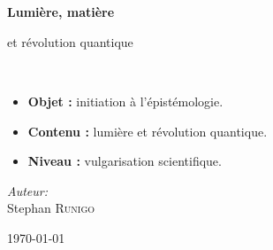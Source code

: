 \begin{titlepage}
%
~\\[1cm]

\begin{center}
\end{center}

\textsc{\Large }\\[0.5cm]

\HRule

\begin{center}
{\huge \bfseries  Lumière, matière\\ }
 
{\Large et révolution quantique\\}%
\end{center}

\HRule \\[1.5cm]

\vspace{3cm}
\begin{itemize}[leftmargin=1cm, label=, itemsep=2pt]
\item {\bf Objet :} initiation à l'épistémologie.
\item {\bf Contenu :} lumière et révolution quantique.
\item {\bf Niveau :} vulgarisation scientifique.
\end{itemize}
\vspace{3cm}


\begin{minipage}{0.4\textwidth}
\begin{flushleft} \large
\end{flushleft}
\end{minipage}
\begin{minipage}{0.4\textwidth}
\begin{flushright} \large
\emph{Auteur:}\\
Stephan \textsc{Runigo}
\end{flushright}
\end{minipage}

\vfill

{\large \today}

\end{titlepage}
